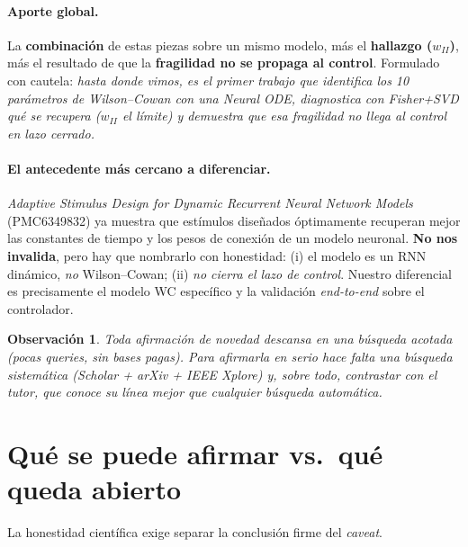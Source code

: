 \documentclass[11pt,a4paper]{article}
\newtheorem{remark}{Observación}
\begin{document}
\paragraph{Aporte global.} La \textbf{combinación} de estas piezas sobre un mismo
modelo, más el \textbf{hallazgo ($w_{II}$)}, más el resultado de que la
\textbf{fragilidad no se propaga al control}. Formulado con cautela: \emph{hasta
donde vimos, es el primer trabajo que identifica los 10 parámetros de
Wilson--Cowan con una Neural ODE, diagnostica con Fisher+SVD qué se recupera
($w_{II}$ el límite) y demuestra que esa fragilidad no llega al control en lazo
cerrado.}

\paragraph{El antecedente más cercano a diferenciar.} \emph{Adaptive Stimulus
Design for Dynamic Recurrent Neural Network Models} (PMC6349832) ya muestra que
estímulos diseñados óptimamente recuperan mejor las constantes de tiempo y los
pesos de conexión de un modelo neuronal. \textbf{No nos invalida}, pero hay que
nombrarlo con honestidad: (i) el modelo es un RNN dinámico, \emph{no} Wilson--Cowan;
(ii) \emph{no cierra el lazo de control}. Nuestro diferencial es precisamente el
modelo WC específico y la validación \emph{end-to-end} sobre el controlador.

\begin{remark}
Toda afirmación de novedad descansa en una búsqueda acotada (pocas queries, sin
bases pagas). Para afirmarla en serio hace falta una búsqueda sistemática
(Scholar + arXiv + IEEE Xplore) y, sobre todo, contrastar con el tutor, que
conoce su línea mejor que cualquier búsqueda automática.
\end{remark}

\section{Qué se puede afirmar vs.\ qué queda abierto}

La honestidad científica exige separar la conclusión firme del \emph{caveat}.
\end{document}
